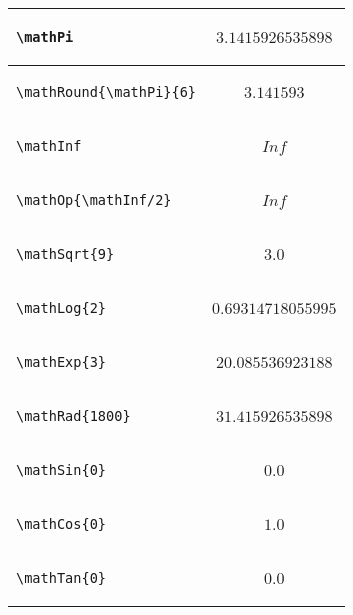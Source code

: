 \documentclass{article}
\begin{document}
\begin{center}
\begin{longtable}{lc}
\begin{lstlisting}
\mathPi
\end{lstlisting} & \(3.1415926535898\)\\
\midrule


\begin{lstlisting}
\mathRound{\mathPi}{6}
\end{lstlisting} & \(3.141593\)\\
\midrule

\begin{lstlisting}
\mathInf
\end{lstlisting} & \(Inf\)\\
\midrule

\begin{lstlisting}
\mathOp{\mathInf/2}
\end{lstlisting} &\(Inf\) \\
\midrule

\begin{lstlisting}
\mathSqrt{9}
\end{lstlisting} & \(3.0\)\\
\midrule

\begin{lstlisting}
\mathLog{2}
\end{lstlisting} & \(0.69314718055995\)\\
\midrule

\begin{lstlisting}
\mathExp{3}
\end{lstlisting} & \(20.085536923188\) \\
\midrule

\begin{lstlisting}
\mathRad{1800}
\end{lstlisting} & \(31.415926535898\)\\
\midrule


\begin{lstlisting}
\mathSin{0}
\end{lstlisting} &\(0.0\)\\
\midrule

\begin{lstlisting}
\mathCos{0}
\end{lstlisting} & \(1.0\)\\
\midrule


\begin{lstlisting}
\mathTan{0}
\end{lstlisting} & \(0.0\)\\
\midrule


\end{longtable}
\end{center}
\end{document}
